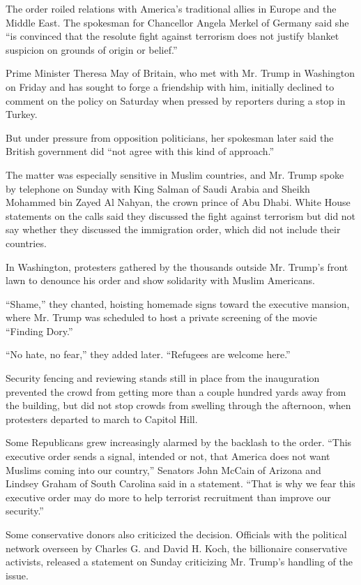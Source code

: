 The order roiled relations with America's traditional allies in Europe
and the Middle East. The spokesman for Chancellor Angela Merkel of
Germany said she ``is convinced that the resolute fight against
terrorism does not justify blanket suspicion on grounds of origin or
belief.''

Prime Minister Theresa May of Britain, who met with Mr. Trump in
Washington on Friday and has sought to forge a friendship with him,
initially declined to comment on the policy on Saturday when pressed by
reporters during a stop in Turkey.

But under pressure from opposition politicians, her spokesman later said
the British government did ``not agree with this kind of approach.''

The matter was especially sensitive in Muslim countries, and Mr. Trump
spoke by telephone on Sunday with King Salman of Saudi Arabia and Sheikh
Mohammed bin Zayed Al Nahyan, the crown prince of Abu Dhabi. White House
statements on the calls said they discussed the fight against terrorism
but did not say whether they discussed the immigration order, which did
not include their countries.

In Washington, protesters gathered by the thousands outside Mr. Trump's
front lawn to denounce his order and show solidarity with Muslim
Americans.

``Shame,'' they chanted, hoisting homemade signs toward the executive
mansion, where Mr. Trump was scheduled to host a private screening of
the movie ``Finding Dory.''

``No hate, no fear,'' they added later. ``Refugees are welcome here.''

Security fencing and reviewing stands still in place from the
inauguration prevented the crowd from getting more than a couple hundred
yards away from the building, but did not stop crowds from swelling
through the afternoon, when protesters departed to march to Capitol
Hill.

Some Republicans grew increasingly alarmed by the backlash to the order.
``This executive order sends a signal, intended or not, that America
does not want Muslims coming into our country,'' Senators John McCain of
Arizona and Lindsey Graham of South Carolina said in a statement. ``That
is why we fear this executive order may do more to help terrorist
recruitment than improve our security.''

Some conservative donors also criticized the decision. Officials with
the political network overseen by Charles G. and David H. Koch, the
billionaire conservative activists, released a statement on Sunday
criticizing Mr. Trump's handling of the issue.


